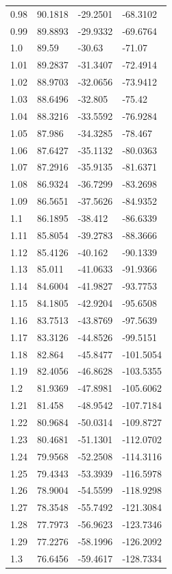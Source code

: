 \begin{tabular}{llll}
0.98 & 90.1818 & -29.2501 & -68.3102 \\
0.99 & 89.8893 & -29.9332 & -69.6764 \\
1.0 & 89.59 & -30.63 & -71.07 \\
1.01 & 89.2837 & -31.3407 & -72.4914 \\
1.02 & 88.9703 & -32.0656 & -73.9412 \\
1.03 & 88.6496 & -32.805 & -75.42 \\
1.04 & 88.3216 & -33.5592 & -76.9284 \\
1.05 & 87.986 & -34.3285 & -78.467 \\
1.06 & 87.6427 & -35.1132 & -80.0363 \\
1.07 & 87.2916 & -35.9135 & -81.6371 \\
1.08 & 86.9324 & -36.7299 & -83.2698 \\
1.09 & 86.5651 & -37.5626 & -84.9352 \\
1.1 & 86.1895 & -38.412 & -86.6339 \\
1.11 & 85.8054 & -39.2783 & -88.3666 \\
1.12 & 85.4126 & -40.162 & -90.1339 \\
1.13 & 85.011 & -41.0633 & -91.9366 \\
1.14 & 84.6004 & -41.9827 & -93.7753 \\
1.15 & 84.1805 & -42.9204 & -95.6508 \\
1.16 & 83.7513 & -43.8769 & -97.5639 \\
1.17 & 83.3126 & -44.8526 & -99.5151 \\
1.18 & 82.864 & -45.8477 & -101.5054 \\
1.19 & 82.4056 & -46.8628 & -103.5355 \\
1.2 & 81.9369 & -47.8981 & -105.6062 \\
1.21 & 81.458 & -48.9542 & -107.7184 \\
1.22 & 80.9684 & -50.0314 & -109.8727 \\
1.23 & 80.4681 & -51.1301 & -112.0702 \\
1.24 & 79.9568 & -52.2508 & -114.3116 \\
1.25 & 79.4343 & -53.3939 & -116.5978 \\
1.26 & 78.9004 & -54.5599 & -118.9298 \\
1.27 & 78.3548 & -55.7492 & -121.3084 \\
1.28 & 77.7973 & -56.9623 & -123.7346 \\
1.29 & 77.2276 & -58.1996 & -126.2092 \\
1.3 & 76.6456 & -59.4617 & -128.7334 \\

\end{tabular}
